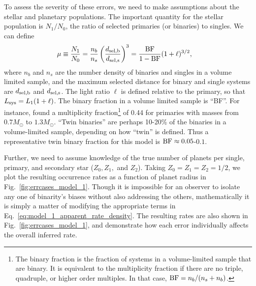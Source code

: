 To assess the severity of these errors, we need to make assumptions about the 
stellar and planetary populations.
The important quantity for the stellar population is $N_1/N_0$, the ratio of 
selected primaries (or binaries) to singles. We can define
\begin{align}
\mu \equiv \frac{N_1}{N_0} &=
\frac{n_b}{n_s} \left(\frac{d_{\rm sel,b}}{d_{\rm sel,s}}\right)^3 = 
\frac{{\rm BF}}{1-{\rm BF}} (1+\ell)^{3/2},
\label{eq:mu_definition}
\end{align}
where $n_b$ and $n_s$ are the number density of binaries and singles in a 
volume limited sample, and the maximum selected distance for binary and single 
systems are $d_{\rm sel,b}$ and $d_{\rm sel,s}$.
The light ratio $\ell$ is defined relative to the primary, so that
$L_{\rm sys} = L_1(1+\ell)$.
The binary fraction in a volume limited sample is ``{\rm BF}''.
For instance, \citet{raghavan_survey_2010} found a multiplicity 
fraction\footnote{
    The binary fraction is the fraction of systems in a volume-limited sample 
    that are binary. It is equivalent to the multiplicity fraction if there 
    are no triple, quadruple, or higher order multiples. In that case, ${\rm 
        BF} = n_b / (n_s+n_b)$.
} of 0.44 for primaries with masses from $0.7M_\odot$ to $1.3M_\odot$. 
``Twin binaries'' are perhaps 10-20\% of the binaries in a volume-limited 
sample, depending on how ``twin'' is defined.
Thus a representative twin binary fraction for this model is ${\rm BF}\approx 
0.05$-$0.1$. 

Further, we need to assume knowledge of the true number of planets per 
single, primary, and secondary star ($Z_0,Z_1,$ and $Z_2$).
Taking $Z_0=Z_1=Z_2=1/2$, we plot the resulting occurrence rates as a function 
of planet radius in Fig.~\ref{fig:errcases_model_1}.
Though it is impossible for an observer to isolate any one of binarity's 
biases without also addressing the others, mathematically it is simply a 
matter of modifying the appropriate terms in 
Eq.~\ref{eq:model_1_apparent_rate_density}.
The resulting rates are also shown in 
Fig.~\ref{fig:errcases_model_1}, and demonstrate how each 
error individually affects the overall inferred rate.

